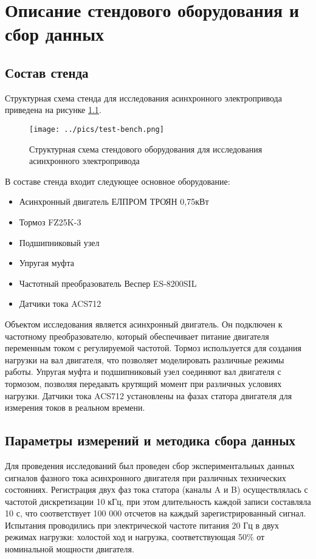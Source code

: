 \chapter{Описание стендового оборудования и сбор данных}

\section{Состав стенда}
Структурная схема стенда для исследования асинхронного электропривода приведена на рисунке \ref{fig:test_bench_scheme}.


\begin{figure}[h!]
    \centering
    \texttt{[image: ../pics/test-bench.png]}
    \caption{Структурная схема стендового оборудования для исследования асинхронного электропривода}
    \label{fig:test_bench_scheme}
\end{figure}

В составе стенда входит следующее основное оборудование:
\begin{itemize}
\item Асинхронный двигатель ЕЛПРОМ ТРОЯН 0,75кВт
\item Тормоз FZ25K-3
\item Подшипниковый узел
\item Упругая муфта
\item Частотный преобразователь Веспер ES-8200SIL
\item Датчики тока ACS712
\end{itemize}


Объектом исследования является асинхронный двигатель. Он подключен к частотному преобразователю, который обеспечивает питание двигателя переменным током с регулируемой частотой. Тормоз используется для создания нагрузки на вал двигателя, что позволяет моделировать различные режимы работы. Упругая муфта и подшипниковый узел соединяют вал двигателя с тормозом, позволяя передавать крутящий момент при различных условиях нагрузки. Датчики тока ACS712 установлены на фазах статора двигателя для измерения токов в реальном времени.

\section{Параметры измерений и методика сбора данных}
Для проведения исследований был проведен сбор экспериментальных данных сигналов фазного тока асинхронного двигателя при различных технических состояниях. Регистрация двух фаз тока статора (каналы A и B) осуществлялась с частотой дискретизации 10 кГц, при этом длительность каждой записи составляла 10 с, что соответствует 100 000 отсчетов на каждый зарегистрированный сигнал. Испытания проводились при электрической частоте питания 20 Гц в двух режимах нагрузки: холостой ход и нагрузка, соответствующая 50\% от номинальной мощности двигателя.


